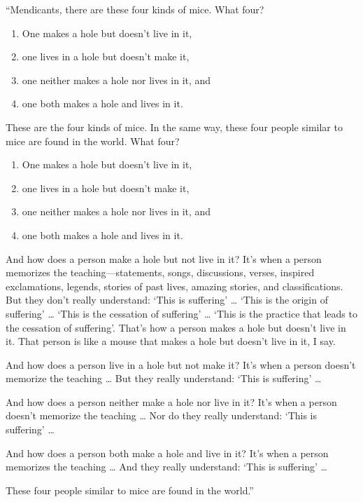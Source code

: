 \documentclass[12pt,openany]{book}%
\begin{document}
“Mendicants, there are these four kinds of mice. What four? 

\begin{enumerate}%
\item One makes a hole but doesn’t live in it, %
\item one lives in a hole but doesn’t make it, %
\item one neither makes a hole nor lives in it, and %
\item one both makes a hole and lives in it. %
\end{enumerate}

These are the four kinds of mice. In the same way, these four people similar to mice are found in the world. What four? 

\begin{enumerate}%
\item One makes a hole but doesn’t live in it, %
\item one lives in a hole but doesn’t make it, %
\item one neither makes a hole nor lives in it, and %
\item one both makes a hole and lives in it. %
\end{enumerate}

And how does a person make a hole but not live in it? It’s when a person memorizes the teaching—statements, songs, discussions, verses, inspired exclamations, legends, stories of past lives, amazing stories, and classifications. But they don’t really understand: ‘This is suffering’ … ‘This is the origin of suffering’ … ‘This is the cessation of suffering’ … ‘This is the practice that leads to the cessation of suffering’. That’s how a person makes a hole but doesn’t live in it. That person is like a mouse that makes a hole but doesn’t live in it, I say. 

And how does a person live in a hole but not make it? It’s when a person doesn’t memorize the teaching … But they really understand: ‘This is suffering’ … 

And how does a person neither make a hole nor live in it? It’s when a person doesn’t memorize the teaching … Nor do they really understand: ‘This is suffering’ … 

And how does a person both make a hole and live in it? It’s when a person memorizes the teaching … And they really understand: ‘This is suffering’ … 

These four people similar to mice are found in the world.” 
\end{document}
